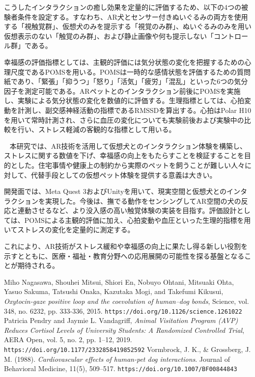 \documentclass[a4j]{ltjsarticle}
\newcounter{seccnt}
\newcommand{\usection}[1]{\ \newline{\bf\underline{\theseccnt\stepcounter{seccnt}. #1}\hspace{10pt}}}
\begin{document}
こうしたインタラクションの癒し効果を定量的に評価するため、以下の4つの被験者条件を設定する。すなわち、AR犬とセンサー付きぬいぐるみの両方を使用する「視触覚群」、仮想犬のみを提示する「視覚のみ群」、ぬいぐるみのみを用い仮想表示のない「触覚のみ群」、および静止画像や何も提示しない「コントロール群」である。

幸福感の評価指標としては、主観的評価には気分状態の変化を把握するための心理尺度であるPOMSを用いる。POMSは一時的な感情状態を評価するための質問紙であり、「緊張」「抑うつ」「怒り」「活気」「疲労」「混乱」といった6つの気分因子を測定可能である。ARペットとのインタラクション前後にPOMSを実施し、実験による気分状態の変化を数値的に評価する。生理指標としては、心拍変動を計測し、副交感神経活動の指標であるRMSSDを算出する。心拍はPolar H10を用いて常時計測され、さらに血圧の変化についても実験前後および実験中の比較を行い、ストレス軽減の客観的な指標として用いる。


\usection{まとめ}
本研究では、AR技術を活用して仮想犬とのインタラクション体験を構築し、ストレスに関する数値を下げ、幸福感の向上をもたらすことを検証することを目的とした。住宅事情や健康上の制約から実際のペットを飼うことが難しい人々に対して、代替手段としての仮想ペット体験を提供する意義は大きい。

開発面では、Meta Quest 3およびUnityを用いて、現実空間と仮想犬とのインタラクションを実現した。今後は、撫でる動作をセンシングしてAR空間の犬の反応と連動させるなど、より没入感の高い触覚体験の実装を目指す。評価設計としては、POMSによる主観的評価に加え、心拍変動や血圧といった生理的指標を用いてストレスの変化を定量的に測定する。

これにより、AR技術がストレス緩和や幸福感の向上に果たし得る新しい役割を示すとともに、医療・福祉・教育分野への応用展開の可能性を探る基盤となることが期待される。

\small
\begin{thebibliography}{9}
 Miho Nagasawa, Shouhei Mitsui, Shiori En, Nobuyo Ohtani, Mitsuaki Ohta, Yasuo Sakuma, Tatsushi Onaka, Kazutaka Mogi, and Takefumi Kikusui, 
\textit{Oxytocin-gaze positive loop and the coevolution of human–dog bonds}, 
Science, vol. 348, no. 6232, pp. 333-336, 2015.
\texttt{https://doi.org/10.1126/science.1261022}
 Patricia Pendry and Jaymie L. Vandagriff, 
\textit{Animal Visitation Program (AVP) Reduces Cortisol Levels of University Students: A Randomized Controlled Trial}, 
AERA Open, vol. 5, no. 2, pp. 1–12, 2019.
\texttt{https://doi.org/10.1177/2332858419852592}
Vormbrock, J. K., \& Grossberg, J. M. (1988).
\textit{Cardiovascular effects of human-pet dog interactions}.
Journal of Behavioral Medicine, 11(5), 509–517.
\texttt{https://doi.org/10.1007/BF00844843}

\end{thebibliography}
\end{document}
